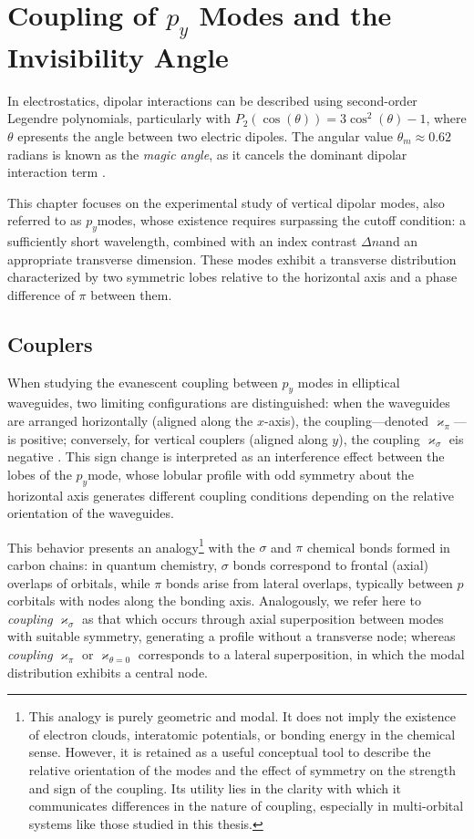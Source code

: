 \chapter{Coupling of $p_y$ Modes and the Invisibility Angle \label{cap:invisibility}}
In electrostatics, dipolar interactions can be described using second-order Legendre polynomials, particularly with $P_2(\cos(\theta))=3\cos^2(\theta)-1$, where $\theta$ epresents the angle between two electric dipoles. The angular value $\theta_m
\approx 0.62$ radians is known as the \textit{magic angle}, as it cancels the dominant dipolar interaction term \citep{medmagic}.

This chapter focuses on the experimental study of vertical dipolar modes, also referred to as $p_y$modes, whose existence requires surpassing the cutoff condition: a sufficiently short wavelength, combined with an index contrast $\Delta n$and an appropriate transverse dimension. These modes exhibit a transverse distribution characterized by two symmetric lobes relative to the horizontal axis and a phase difference of $\pi$ between them.

\section{Couplers}

When studying the evanescent coupling between $p_y$ modes in elliptical waveguides, two limiting configurations are distinguished: when the waveguides are arranged horizontally (aligned along the $x$-axis), the coupling—denoted $\varkappa_\pi$​—is positive; conversely, for vertical couplers (aligned along $y$), the coupling $\varkappa_\sigma$ eis negative \citep{Pmodecoupling}. This sign change is interpreted as an interference effect between the lobes of the $p_y$mode, whose lobular profile with odd symmetry about the horizontal axis generates different coupling conditions depending on the relative orientation of the waveguides.

This behavior presents an analogy\footnote{This analogy is purely geometric and modal. It does not imply the existence of electron clouds, interatomic potentials, or bonding energy in the chemical sense. However, it is retained as a useful conceptual tool to describe the relative orientation of the modes and the effect of symmetry on the strength and sign of the coupling. Its utility lies in the clarity with which it communicates differences in the nature of coupling, especially in multi-orbital systems like those studied in this thesis.} with the $\sigma$ and 
$\pi$ chemical bonds formed in carbon chains: in quantum chemistry, $\sigma$ bonds correspond to frontal (axial) overlaps of orbitals, while $\pi$ bonds arise from lateral overlaps, typically between $p$ corbitals with nodes along the bonding axis. Analogously, we refer here to \textit{coupling} $\varkappa_\sigma$ as that which occurs through axial superposition between modes with suitable symmetry, generating a profile without a transverse node; whereas \textit{coupling} $\varkappa_{\pi}$ or $\varkappa_{\theta = 0}$ corresponds to a lateral superposition, in which the modal distribution exhibits a central node.

